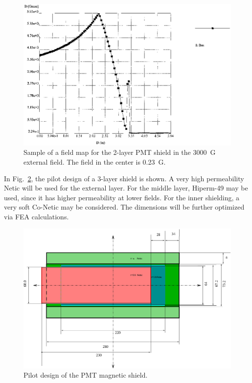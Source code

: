\begin{figure}[htbp]
\centering
\includegraphics[width=.8\textwidth]{magshieldGrilli-1.ps}
\caption{\small{Sample of a field map for the 2-layer PMT shield in the 
3000~G external field.  The field in the center is 0.23~G.}}
\label{GRILLI}
\end{figure}

In Fig.~\ref{VBT3CY}, the pilot design of a 3-layer shield is shown.  A very high 
permeability Netic will be used for the external layer.  For the middle layer, 
Hiperm-49 may be used, since it has higher permeability at lower fields.  For the 
inner shielding, a very soft Co-Netic may be considered.  The dimensions will be 
further optimized via FEA calculations. 

\begin{figure}[htbp]
\centering
\includegraphics[width=1.0\textwidth]{R2083-3000-ph.eps}
\caption{\small{Pilot design of the PMT magnetic shield.}}
\label{VBT3CY}
\end{figure}

